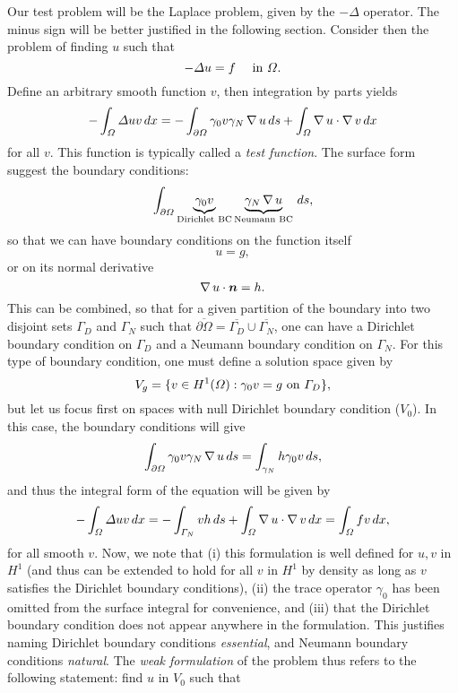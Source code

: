 Our test problem will be the Laplace problem, given by the $-\Delta$ operator. The minus sign will be better justified in the following section. Consider then the problem of finding $u$ such that 
\begin{equation}
    -\Delta u = f \quad \text{ in }\Omega.
\end{equation}
Define an arbitrary smooth function $v$, then integration by parts yields
\begin{equation}\label{eq:ibp-poisson}
    - \int_\Omega \Delta u v\,dx = -\int_{\partial\Omega}\gamma_0 v \gamma_N \operatorname{\nabla} u \,ds + \int_\Omega \operatorname{\nabla} u \cdot \operatorname{\nabla} v\,dx
\end{equation}
for all $v$. This function is typically called a \emph{test function}. The surface form suggest the boundary conditions: 
\begin{equation}
    \int_{\partial\Omega}\underbrace{\gamma_0 v}_\text{Dirichlet BC} \underbrace{\gamma_N \operatorname{\nabla} u}_\text{Neumann BC} \,ds,
\end{equation}
so that we can have boundary conditions on the function itself  
\begin{equation*}
    u = g,
\end{equation*}
or on its normal derivative
\begin{equation*}
    \grad u \cdot \vec n = h.
\end{equation*}
This can be combined, so that for a given partition of the boundary into two disjoint sets $\Gamma_D$ and $\Gamma_N$ such that $\overline{\partial\Omega} = \overline{\Gamma_D}\cup\overline{\Gamma_N}$, one can have a Dirichlet boundary condition on $\Gamma_D$ and a Neumann boundary condition on $\Gamma_N$. For this type of boundary condition, one must define a solution space given by 
\begin{equation}
    V_g = \{v \in H^1(\Omega): \gamma_0 v = g \text{ on }\Gamma_D\},
\end{equation}
but let us focus first on spaces with null Dirichlet boundary condition ($V_0$). In this case, the boundary conditions will give
\begin{equation*}
    \int_{\partial\Omega}\gamma_0 v \gamma_N \operatorname{\nabla} u\,ds = \int_{\gamma_N} h \gamma_0 v\,ds,
\end{equation*}
and thus the integral form of the equation will be given by
\begin{equation*}
    -\int_\Omega\Delta u v\,dx = -\int_{\Gamma_N}v h\,ds + \int_\Omega \operatorname{\nabla} u \cdot \operatorname{\nabla} v\,dx = \int_\Omega f v\,dx,
\end{equation*}
for all smooth $v$. Now, we note that (i) this formulation is well defined for $u,v$ in $H^1$ (and thus can be extended to hold for all $v$ in $H^1$ by density as long as $v$ satisfies the Dirichlet boundary conditions), (ii) the trace operator $\gamma_0$ has been omitted from the surface integral for convenience, and (iii) that the Dirichlet boundary condition does not appear anywhere in the formulation. This justifies naming Dirichlet boundary conditions \emph{essential}, and Neumann boundary conditions \emph{natural}. The \emph{weak formulation} of the problem thus refers to the following statement: find $u$ in $V_0$ such that
